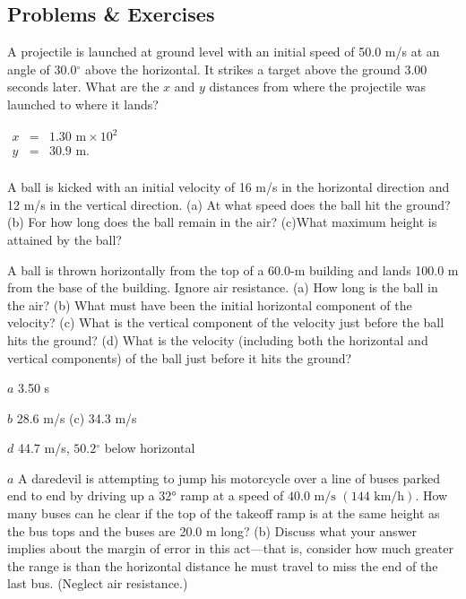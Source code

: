 \documentclass[
]{book}
\newenvironment{problems-exercises}{}{}
\begin{document}
\hypertarget{fs-id1875655}{}
\begin{problems-exercises}

\hypertarget{problems-exercises-8}{%
\subsection{Problems \& Exercises}\label{problems-exercises-8}}

\hypertarget{fs-id1923898}{}
\leavevmode\hypertarget{fs-id1105650}{}%
A projectile is launched at ground level with an initial speed of 50.0
m/s at an angle of \(30.0{^\circ}\) above the horizontal. It strikes a
target above the ground 3.00 seconds later. What are the \(x{}\) and \(y{}\)
distances from where the projectile was launched to where it lands?

\leavevmode\hypertarget{fs-id1543587}{}%
\(\begin{array}{lll} x & = & {\text{1.30\ m} \times 10^{2}} \\ y & = & {\text{30}\text{.9\ m.}} \\ \end{array}\)

\hypertarget{fs-id1275043}{}
\leavevmode\hypertarget{fs-id1019417}{}%
A ball is kicked with an initial velocity of 16 m/s in the horizontal
direction and 12 m/s in the vertical direction. (a) At what speed does
the ball hit the ground? (b) For how long does the ball remain in the
air? (c)What maximum height is attained by the ball?

\hypertarget{fs-id2889503}{}
\leavevmode\hypertarget{fs-id1790979}{}%
A ball is thrown horizontally from the top of a 60.0-m building and
lands 100.0 m from the base of the building. Ignore air resistance. (a)
How long is the ball in the air? (b) What must have been the initial
horizontal component of the velocity? (c) What is the vertical component
of the velocity just before the ball hits the ground? (d) What is the
velocity (including both the horizontal and vertical components) of the
ball just before it hits the ground?

\leavevmode\hypertarget{fs-id1945253}{}%
\(a\) 3.50 s

\(b\) 28.6 m/s (c) 34.3 m/s

\(d\) 44.7 m/s, \(50.2{^\circ}\) below horizontal

\hypertarget{fs-id2197387}{}
\leavevmode\hypertarget{fs-id2261404}{}%
\(a\) A daredevil is attempting to jump his motorcycle over a line of
buses parked end to end by driving up a \(\text{32°}{}\) ramp at a speed
of \({\text{40}\text{.}\text{0~m/s~}(\text{144~km/h})}{}\). How many buses
can he clear if the top of the takeoff ramp is at the same height as the
bus tops and the buses are 20.0 m long? (b) Discuss what your answer
implies about the margin of error in this act---that is, consider how
much greater the range is than the horizontal distance he must travel to
miss the end of the last bus. (Neglect air resistance.)


\end{problems-exercises}
\end{document}
